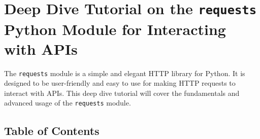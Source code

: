 \documentclass[
  letterpaper,
  DIV=11,
  numbers=noendperiod]{scrreprt}
\begin{document}

\chapter{\texorpdfstring{Deep Dive Tutorial on the \texttt{requests}
Python Module for Interacting with
APIs}{Deep Dive Tutorial on the requests Python Module for Interacting with APIs}}\label{deep-dive-tutorial-on-the-requests-python-module-for-interacting-with-apis}

The \texttt{requests} module is a simple and elegant HTTP library for
Python. It is designed to be user-friendly and easy to use for making
HTTP requests to interact with APIs. This deep dive tutorial will cover
the fundamentals and advanced usage of the \texttt{requests} module.

\section{Table of Contents}\label{table-of-contents-8}
\end{document}
